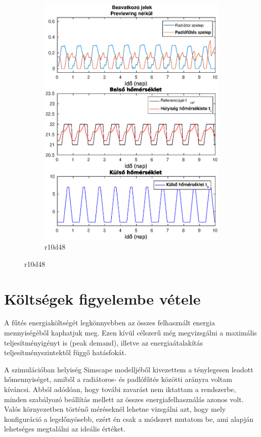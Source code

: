 \begin{figure}[H]
\begin{subfigure}[t]{0.51\textwidth}
		\includegraphics[trim=0 0 0 0, clip,width=\textwidth]{figures/onlab/compare/A_C_P10D48}
		\caption{r10d48}
		\label{fig:mpc-pr10d48}
	\end{subfigure}
\end{figure}


\section{Költségek figyelembe vétele}


A fűtés energiaköltségét legkönnyebben az összes felhasznált energia mennyiségéből kaphatjuk meg. Ezen kívül célszerű még megvizsgálni a maximális teljesítményigényt is (peak demand), illetve az energiaátalakítás teljesítményszintektől függő hatásfokát.

A szimulációban helyiség Simscape modelljéből kivezettem a ténylegesen leadott hőmennyiséget, amiből a radiátoros- és padlófűtés közötti arányra voltam kíváncsi. Abból adódóan, hogy továbi zavarást nem iktattam a rendszerbe, minden szabályozó beállítás mellett az összes energiafelhasználás azonos volt. Valós környezetben történő méréseknél lehetne vizsgálni azt, hogy mely konfiguráció a legelőnyösebb, ezért én csak a módszert mutatom be, ami alapján lehetséges megtalálni az ideális értéket.


